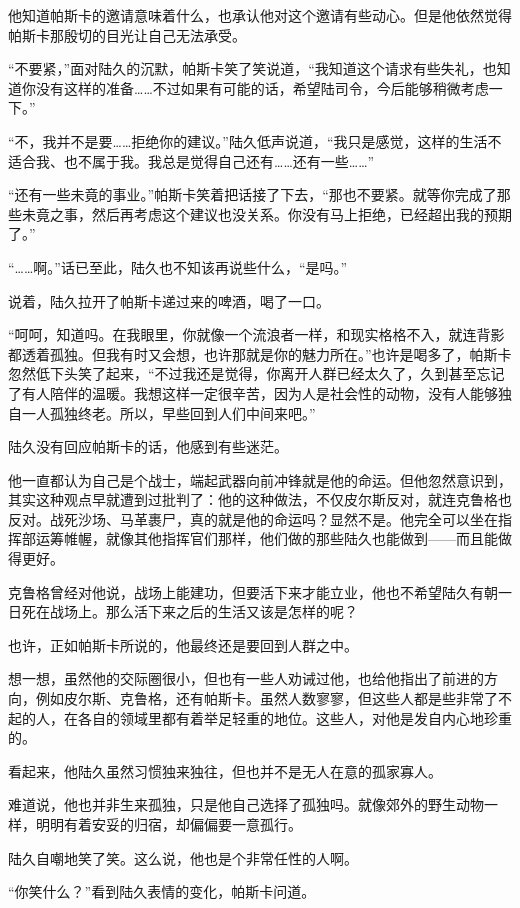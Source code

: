 他知道帕斯卡的邀请意味着什么，也承认他对这个邀请有些动心。但是他依然觉得帕斯卡那殷切的目光让自己无法承受。

“不要紧，”面对陆久的沉默，帕斯卡笑了笑说道，“我知道这个请求有些失礼，也知道你没有这样的准备……不过如果有可能的话，希望陆司令，今后能够稍微考虑一下。”

“不，我并不是要……拒绝你的建议。”陆久低声说道，“我只是感觉，这样的生活不适合我、也不属于我。我总是觉得自己还有……还有一些……”

“还有一些未竟的事业。”帕斯卡笑着把话接了下去，“那也不要紧。就等你完成了那些未竟之事，然后再考虑这个建议也没关系。你没有马上拒绝，已经超出我的预期了。”

“……啊。”话已至此，陆久也不知该再说些什么，“是吗。”

说着，陆久拉开了帕斯卡递过来的啤酒，喝了一口。

“呵呵，知道吗。在我眼里，你就像一个流浪者一样，和现实格格不入，就连背影都透着孤独。但我有时又会想，也许那就是你的魅力所在。”也许是喝多了，帕斯卡忽然低下头笑了起来，“不过我还是觉得，你离开人群已经太久了，久到甚至忘记了有人陪伴的温暖。我想这样一定很辛苦，因为人是社会性的动物，没有人能够独自一人孤独终老。所以，早些回到人们中间来吧。”

陆久没有回应帕斯卡的话，他感到有些迷茫。

他一直都认为自己是个战士，端起武器向前冲锋就是他的命运。但他忽然意识到，其实这种观点早就遭到过批判了：他的这种做法，不仅皮尔斯反对，就连克鲁格也反对。战死沙场、马革裹尸，真的就是他的命运吗？显然不是。他完全可以坐在指挥部运筹帷幄，就像其他指挥官们那样，他们做的那些陆久也能做到——而且能做得更好。

克鲁格曾经对他说，战场上能建功，但要活下来才能立业，他也不希望陆久有朝一日死在战场上。那么活下来之后的生活又该是怎样的呢？

也许，正如帕斯卡所说的，他最终还是要回到人群之中。

想一想，虽然他的交际圈很小，但也有一些人劝诫过他，也给他指出了前进的方向，例如皮尔斯、克鲁格，还有帕斯卡。虽然人数寥寥，但这些人都是些非常了不起的人，在各自的领域里都有着举足轻重的地位。这些人，对他是发自内心地珍重的。

看起来，他陆久虽然习惯独来独往，但也并不是无人在意的孤家寡人。

难道说，他也并非生来孤独，只是他自己选择了孤独吗。就像郊外的野生动物一样，明明有着安妥的归宿，却偏偏要一意孤行。

陆久自嘲地笑了笑。这么说，他也是个非常任性的人啊。

“你笑什么？”看到陆久表情的变化，帕斯卡问道。

